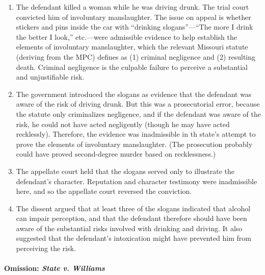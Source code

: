 \begin{enumerate}
    \item The defendant killed a woman while he was driving drunk. The trial court convicted him of involuntary manslaughter. The issue on appeal is whether stickers and pins inside the car with ``drinking slogans''---``The more I drink the better I look,'' etc.---were admissible evidence to help establish the elements of involuntary manslaughter, which the relevant Missouri statute (deriving from the MPC) defines as (1) criminal negligence and (2) resulting death. Criminal negligence is the culpable failure to perceive a substantial and unjustifiable risk.
    \item The government introduced the slogans as evidence that the defendant was aware of the risk of driving drunk. But this was a prosecutorial error, because the statute only criminalizes negligence, and if the defendant was aware of the risk, he could not have acted negligently (though he may have acted recklessly). Therefore, the evidence was inadmissible in th state's attempt to prove the elements of involuntary manslaughter. (The prosecution probably could have proved second-degree murder based on recklessness.)
    \item The appellate court held that the slogans served only to illustrate the defendant's character. Reputation and character testimony were inadmissible here, and so the appellate court reversed the conviction.
    \item The dissent argued that at least three of the slogans indicated that alcohol can impair perception, and that the defendant therefore should have been aware of the substantial risks involved with drinking and driving. It also suggested that the defendant's intoxication might have prevented him from perceiving the risk.
\end{enumerate}

\paragraph{Omission: \emph{State v. Williams}}

